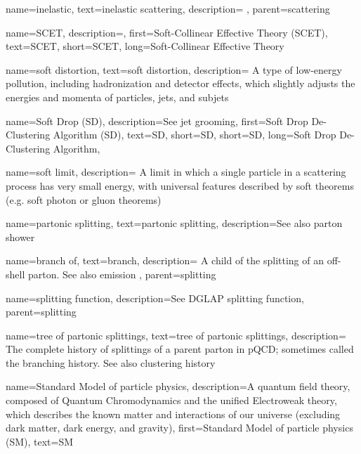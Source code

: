 {
    name=inelastic,
    text=inelastic scattering,
    description={
    },
    parent=scattering
}

{
    name=SCET,
    description={},
    first={Soft-Collinear Effective Theory (SCET)},
    text={SCET},
    short={SCET},
    long={Soft-Collinear Effective Theory}
}

{
  name=soft distortion,
  text=soft distortion,
  description={
        A type of low-energy pollution, including hadronization and detector effects, which slightly adjusts the energies and momenta of particles, jets, and subjets
  }
}

{
    name=Soft Drop (SD),
    description={See jet grooming},
    first={Soft Drop De-Clustering Algorithm (SD)},
    text={SD},
    short={SD},
    short={SD},
    long={Soft Drop De-Clustering Algorithm},
}


{
    name=soft limit,
    description={
        A limit in which a single particle in a scattering process has very small energy, with universal features described by soft theorems (e.g. soft photon or gluon theorems)
    }
}

{
  name=partonic splitting,
  text=partonic splitting,
  description={See also parton shower}
}

    {
      name=branch of,
      text=branch,
      description={
          A child of the splitting of an off-shell parton.
          See also emission
      },
      parent=splitting
    }


    {
      name=splitting function,
      description={See DGLAP splitting function},
      parent=splitting
    }

    {
      name=tree of partonic splittings,
      text=tree of partonic splittings,
      description={
          The complete history of splittings of a parent parton in pQCD;
          sometimes called the branching history.
          See also clustering history
      }
    }





{
  name=Standard Model of particle physics,
  description={A quantum field theory, composed of Quantum Chromodynamics and the unified Electroweak theory, which describes the known matter and interactions of our universe (excluding dark matter, dark energy, and gravity)},
  first=Standard Model of particle physics (SM),
  text=SM
}

